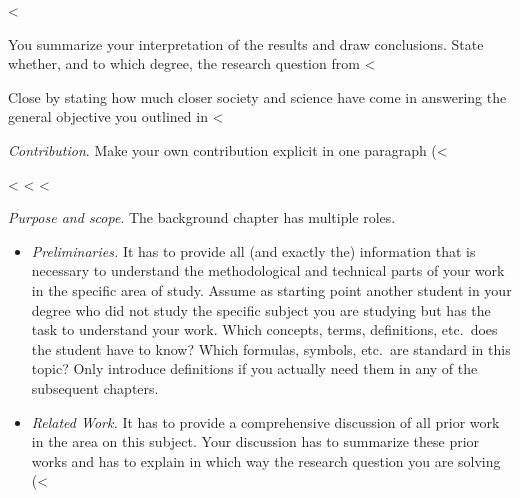 {{{<%

You summarize your interpretation of the results and draw conclusions.
State whether, and to which degree, the research question from <%

Close by stating how much closer society and science have come in answering the general objective you outlined in <%

\emph{Contribution}.
Make your own contribution explicit in one paragraph (<%

<%
<%
<%

\emph{Purpose and scope}.
The background chapter has multiple roles.
\begin{itemize}

  \item \emph{Preliminaries.}
        It has to provide all (and exactly the) information that is necessary to understand the methodological and technical parts of your work in the specific area of study.
        Assume as starting point another student in your degree who did not study the specific subject you are studying but has the task to understand your work.
        Which concepts, terms, definitions, etc.\ does the student have to know?
        Which formulas, symbols, etc.\ are standard in this topic?
        Only introduce definitions if you actually need them in any of the subsequent chapters.

  \item \emph{Related Work.}
        It has to provide a comprehensive discussion of all prior work in the area on this subject.
        Your discussion has to summarize these prior works and has to explain in which way the research question you are solving (<%


\end{itemize}}}}
